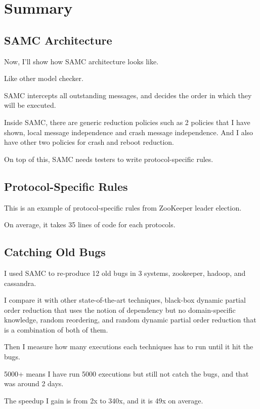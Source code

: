 \section{Summary}

\subsection{SAMC Architecture}

Now, I'll show how SAMC architecture looks like.

Like other model checker.

SAMC intercepts all outstanding messages, and decides the order in which they
will be executed.

Inside SAMC, there are generic reduction policies such as 2 policies that I have
shown, local message independence and crash message independence. And I also
have other two policies for crash and reboot reduction.

On top of this, SAMC needs testers to write protocol-specific rules.

\subsection{Protocol-Specific Rules}

This is an example of protocol-specific rules from ZooKeeper leader election.

On average, it takes 35 lines of code for each protocols.

\subsection{Catching Old Bugs}

I used SAMC to re-produce 12 old bugs in 3 systems, zookeeper, hadoop, and
cassandra.

I compare it with other state-of-the-art techniques, black-box dynamic partial
order reduction that uses the notion of dependency but no domain-specific
knowledge, random reordering, and random dynamic partial order reduction that is
a combination of both of them.

Then I measure how many executions each techniques has to run until it hit the
bugs.

5000+ means I have run 5000 executions but still not catch the bugs, and that
was around 2 days.

The speedup I gain is from 2x to 340x, and it is 49x on average.

